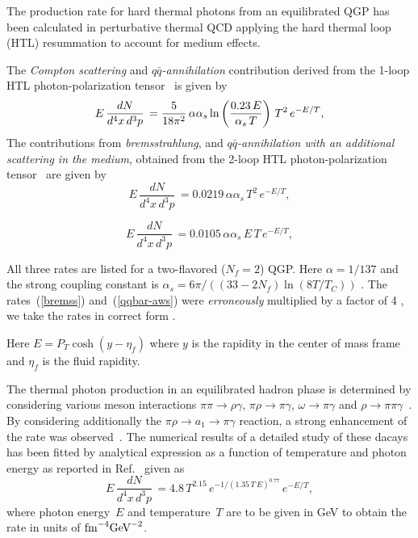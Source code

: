 \documentclass[aps,prc,preprint,superscriptaddress,showpacs,showkeys]{revtex4-1}
\begin{document}
  The production rate for hard thermal photons from an equilibrated 
QGP has been calculated in
perturbative thermal QCD applying the hard thermal loop (HTL)
resummation to account for medium effects. 


The {\em Compton scattering} and {\em $q\bar{q}$-annihilation} contribution
derived from the 1-loop HTL photon-polarization 
tensor~\cite{KAPUSTA_1991,BAIER_1991,TRAXLER_1995} is given by
%
\begin{equation} 
 E\,\frac{dN}{d^4x\,d^3p} \, =  {5\over 18 \pi^2}\,\alpha \alpha_s 
       \ln \left(\frac{0.23\,E}{\alpha_s\,T}\right)
            \,T^2\,e^{-E/T},
\label{1-loop}
\end{equation}
%
The contributions from {\em bremsstrahlung}, 
and {\em $q\bar{q}$-annihilation with an additional scattering in the medium},
obtained from the 2-loop HTL photon-polarization
tensor~\cite{AURENCHE_1998,THOMA} are given by
%
\begin{equation} 
   E\,\frac{dN}{d^4x\,d^3p} \, = 
        0.0219\,\alpha \alpha_s
        \,T^2\,e^{-E/T},
\label{bremss}
\end{equation}
%

%
\begin{equation} 
      E\,\frac{dN}{d^4x\,d^3p} \, =  
        0.0105\,\alpha \alpha_s
        \,E\,T\,e^{-E/T},
\label{qqbar-aws}
\end{equation}
%

All three rates are listed for a two-flavored
($N_f = 2$) QGP. Here $\alpha=1/137$ and the strong coupling constant is 
$\alpha_s= 6\pi/((33-2N_f) \ln(8T/T_C))$ \cite{KARSCH}.
The rates~(\ref{bremss}) and~(\ref{qqbar-aws}) were 
{\em erroneously} multiplied 
by a factor of 4 \cite{AURENCHE_1998}, 
we take the rates in correct form \cite{THOMA}.

Here $E=P_T \cosh(y-\eta_f)$ where $y$ is the rapidity in the center
of mass frame and $\eta_f$ is the fluid rapidity.

 The thermal photon production in an equilibrated hadron phase
is determined by considering various meson interactions
$\pi \pi \rightarrow \rho \gamma$, $\pi \rho \rightarrow \pi
\gamma$, $\omega \rightarrow \pi \gamma$ and $\rho
\rightarrow \pi \pi \gamma$~\cite{KAPUSTA_1991,NADEAU_1992}.  By considering
additionally the $\pi \rho \rightarrow a_1 \rightarrow \pi \gamma$ reaction, a
strong enhancement of the rate was observed~\cite{XIONG_1992}. 
 The numerical results of a detailed study of these dacays has been
fitted by analytical expression as a function of temperature and photon
energy as reported in Ref.~\cite{THOMA} given as
%
\begin{equation} 
        E\,\frac{dN}{d^4x\,d^3p} \, = 
        4.8\,T^{2.15}\,e^{-1/(1.35\,T\,E)^{0.77}}\,e^{-E/T},
\label{Markus_suggestion}
\end{equation} 
%
where photon energy~$E$ and temperature~$T$ are to be given in GeV to obtain the
rate in units of $\mbox{fm}^{-4}\mbox{GeV}^{-2}$. 
\end{document}
